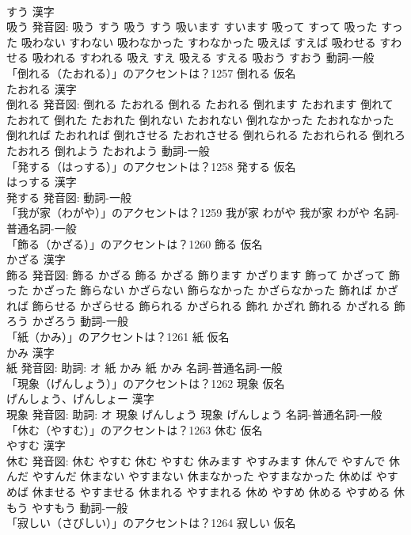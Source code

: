 \documentclass[8pt]{extreport}
\begin{document}
\begin{CJK}{UTF8}{min}
\\	すう 漢字　
\\	吸う 発音図:	吸う すう		吸う すう 吸います すいます 吸って すって 吸った すった 吸わない すわない 吸わなかった すわなかった 吸えば すえば 吸わせる すわせる 吸われる すわれる 吸え すえ 吸える すえる 吸おう すおう				動詞-一般 
\\	「倒れる（たおれる）」のアクセントは？1257	倒れる 仮名　
\\	たおれる 漢字　
\\	倒れる 発音図:	倒れる たおれる		倒れる たおれる 倒れます たおれます 倒れて たおれて 倒れた たおれた 倒れない たおれない 倒れなかった たおれなかった 倒れれば たおれれば 倒れさせる たおれさせる 倒れられる たおれられる 倒れろ たおれろ 倒れよう たおれよう				動詞-一般 
\\	「発する（はっする）」のアクセントは？1258	発する 仮名　
\\	はっする 漢字　
\\	発する 発音図:							動詞-一般 
\\	「我が家（わがや）」のアクセントは？1259		我が家 わがや		我が家 わがや				名詞-普通名詞-一般 
\\	「飾る（かざる）」のアクセントは？1260	飾る 仮名　
\\	かざる 漢字　
\\	飾る 発音図:	飾る かざる		飾る かざる 飾ります かざります 飾って かざって 飾った かざった 飾らない かざらない 飾らなかった かざらなかった 飾れば かざれば 飾らせる かざらせる 飾られる かざられる 飾れ かざれ 飾れる かざれる 飾ろう かざろう				動詞-一般 
\\	「紙（かみ）」のアクセントは？1261	紙 仮名　
\\	かみ 漢字　
\\	紙 発音図: 助詞: オ	紙 かみ		紙 かみ				名詞-普通名詞-一般 
\\	「現象（げんしょう）」のアクセントは？1262	現象 仮名　
\\	げんしょう、げんしょー 漢字　
\\	現象 発音図: 助詞: オ	現象 げんしょう		現象 げんしょう				名詞-普通名詞-一般 
\\	「休む（やすむ）」のアクセントは？1263	休む 仮名　
\\	やすむ 漢字　
\\	休む 発音図:	休む やすむ		休む やすむ 休みます やすみます 休んで やすんで 休んだ やすんだ 休まない やすまない 休まなかった やすまなかった 休めば やすめば 休ませる やすませる 休まれる やすまれる 休め やすめ 休める やすめる 休もう やすもう				動詞-一般 
\\	「寂しい（さびしい）」のアクセントは？1264	寂しい 仮名　

\end{CJK}
\end{document}
